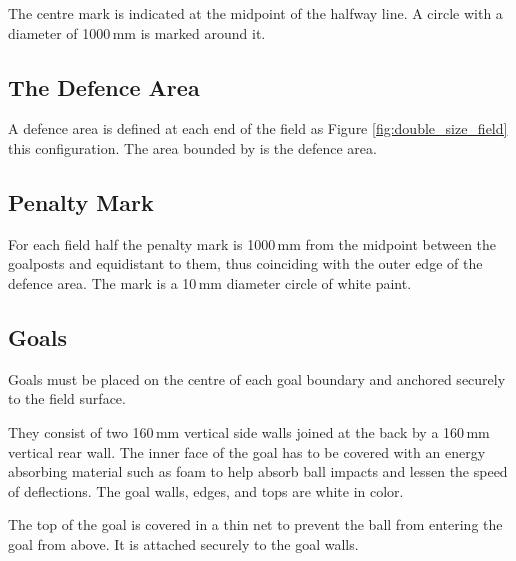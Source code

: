 The centre mark is indicated at the midpoint of the halfway line.
A circle with a diameter of  1000\,mm  is marked around it.

\subsection{The Defence Area}

A defence area is defined at each end of the field as 
  Figure \ref{fig:double_size_field}  this configuration.
The area bounded by  is
the defence area.


\subsection{Penalty Mark}
For each field half the penalty mark is
 1000\,mm  from the midpoint between the goalposts and equidistant to them, thus
coinciding with the outer edge of the defence area.
The mark is a 10\,mm diameter circle of white paint.

\subsection{Goals}
Goals must be placed on the centre of each goal boundary and anchored
securely to the field surface.

They consist of two 160\,mm vertical side walls joined at the back by a 160\,mm
vertical rear wall. The inner face of the goal has to be covered with an energy
absorbing material such as foam to help absorb ball impacts and lessen the speed
of deflections.
The goal walls, edges, and tops are white in color.

The top of the goal is covered in a thin net to prevent the ball
from entering the goal from above. It is attached securely to the 
goal walls.

